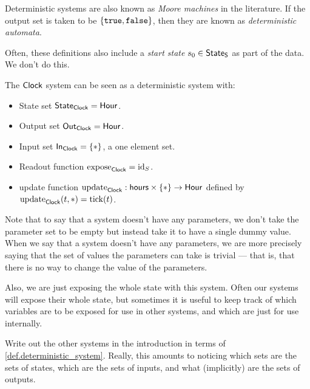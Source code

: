 \documentclass[DynamicalBook]{subfiles}
\begin{document}
\begin{remark}
  Deterministic systems are also known as \emph{Moore machines} in the
  literature. If the output set is taken to be $\{\mathtt{true},
  \mathtt{false}\}$, then they are known as \emph{deterministic automata}.

  Often, these definitions also include a \emph{start state} $s_0 \in \mathsf{State}_{\mathsf{S}}$
  as part of the data. We don't do this.
\end{remark}

\begin{example}\label{ex.clock_system}
  The $\mathsf{Clock}$ system can be seen as a deterministic system with:
  \begin{itemize}
  \item State set $\mathsf{State}_{\mathsf{Clock}} = \mathsf{Hour}$.
  \item Output set $\mathsf{Out}_{\mathsf{Clock}} = \mathsf{Hour}$.
  \item Input set $\mathsf{In}_{\mathsf{Clock}} = \{\ast\}$, a one element set.
  \item Readout function $\mathrm{expose}_{\mathsf{Clock}} = \mathrm{id}_{S}$.
  \item update function $\mathrm{update}_{\mathsf{Clock}} : \mathsf{hours} \times \{\ast\} \to \mathsf{Hour}$
    defined by $\mathrm{update}_{\mathsf{Clock}}(t, \ast) = \mathrm{tick}(t)$.
  \end{itemize}
\end{example}

Note that to say that a system doesn't have any parameters, we don't take the
parameter set to be empty but instead take it to have a single dummy value. When
we say that a system doesn't have any parameters, we are more precisely saying
that the set of values the parameters can take is trivial --- that is, that
there is no way to change the value of the parameters. 

Also, we are just exposing the whole state with this system. Often our systems
will expose their whole state, but sometimes it is useful to keep track of which
variables are to be exposed for use in other systems, and which are just for use internally. 

\begin{exercise}
  Write out the other systems in the introduction in terms of
  \cref{def.deterministic_system}. Really, this amounts to noticing which sets
  are the sets of states, which are the sets of inputs, and what (implicitly)
  are the sets of outputs.
\end{exercise}
\end{document}
